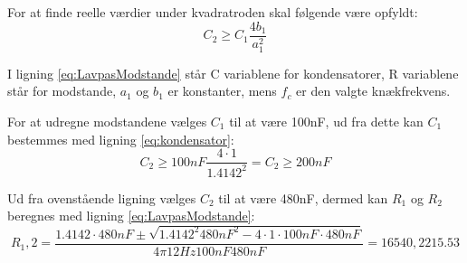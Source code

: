 For at finde reelle værdier under kvadratroden skal følgende være opfyldt:
\begin{equation} \label{eq:kondensator}
C_2 \geq C_1 \frac{4b_1}{a_1^2}
\end{equation}

I ligning \ref{eq:LavpasModstande} står C variablene for kondensatorer, R variablene står for modstande, $a_1$ og $b_1$ er konstanter, mens $f_c$ er den valgte knækfrekvens. 

For at udregne modstandene vælges $C_1$ til at være 100nF, ud fra dette kan $C_1$ bestemmes med ligning \ref{eq:kondensator}:
\begin{equation}
C_2 \geq 100nF \frac{4\cdot 1}{1.4142^2} = C_2 \geq 200nF
\end{equation}

Ud fra ovenstående ligning vælges $C_2$ til at være 480nF, dermed kan $R_1$ og $R_2$ beregnes med ligning \ref{eq:LavpasModstande}:
\begin{equation}
R_1,2 = \frac{1.4142 \cdot 480nF \pm \sqrt{1.4142^2 480nF^2 - 4 \cdot 1 \cdot 100nF \cdot 480nF}}{4 \pi 12Hz 100nF 480nF} = 16540, 2215.53
\end{equation}

